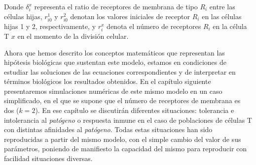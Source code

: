 Donde $\delta_{i}^{x}$ representa el ratio de receptores de membrana de tipo $R_{i}$ entre las células hijas, $r_{i0}^{1}$ y $r_{i0}^{2}$ denotan los valores iniciales de receptor $R_{i}$ en las células hijas 1 y 2, respectivamente, y  $r_{i}^{x}$ denota el número de receptores $R_{i}$ en la célula T $x$ en el momento de la división celular.


Ahora que hemos descrito los conceptos matemáticos que representan las hipótesis biológicas que sustentan este modelo, estamos en condiciones de estudiar las soluciones de las ecuaciones correspondientes y de interpretar en términos biológicos los resultados obtenidos. En el capítulo siguiente presentaremos simulaciones numéricas de este mismo modelo en un caso simplificado, en el que se supone que el número de receptores de membrana es dos ($k = 2$). En ese capítulo se discutirán diferentes situaciones: tolerancia e intolerancia al \textit{patógeno} o respuesta inmune en el caso de poblaciones de células T con distintas afinidades al \textit{patógeno}. Todas estas situaciones han sido reproducidas a partir del mismo modelo, con el simple cambio del valor de sus parámetros, poniendo de manifiesto la capacidad del mismo para reproducir con facilidad situaciones diversas. 


%

